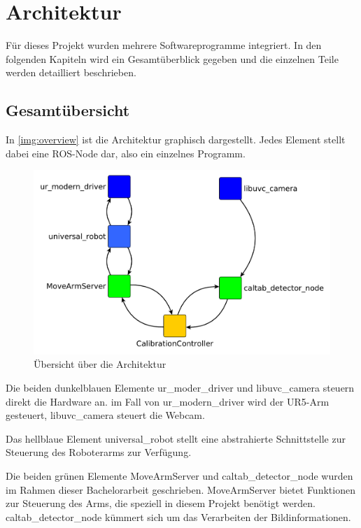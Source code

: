 \chapter{Architektur}
Für dieses Projekt wurden mehrere Softwareprogramme integriert. In den folgenden Kapiteln wird ein Gesamtüberblick gegeben und die einzelnen Teile werden detailliert beschrieben.

\section{Gesamtübersicht} %
\label{sec:gesamtübersicht}
In \autoref{img:overview} ist die Architektur graphisch dargestellt. Jedes Element stellt dabei eine ROS-Node dar, also ein einzelnes Programm.

\begin{figure}[!hbt]
	\centering
	\vspace{1ex}
	\includegraphics[scale=0.6]{../images/overview}
	\caption[Übersicht über die Architektur]{\label{img:overview} Übersicht über die Architektur}
	\vspace{1ex}
\end{figure}

Die beiden dunkelblauen Elemente ur\_moder\_driver und libuvc\_camera steuern direkt die Hardware an. im Fall von ur\_modern\_driver wird der UR5-Arm gesteuert, libuvc\_camera steuert die Webcam.

Das hellblaue Element universal\_robot stellt eine abstrahierte Schnittstelle zur Steuerung des Roboterarms zur Verfügung.

Die beiden grünen Elemente MoveArmServer und caltab\_detector\_node wurden im Rahmen dieser Bachelorarbeit geschrieben. MoveArmServer bietet Funktionen zur Steuerung des Arms, die speziell in diesem Projekt benötigt werden. caltab\_detector\_node kümmert sich um das Verarbeiten der Bildinformationen.

